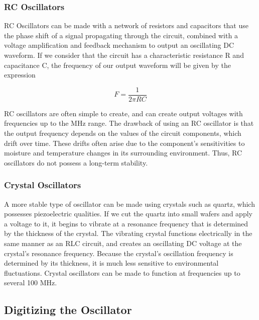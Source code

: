 \subsubsection{RC Oscillators}
\label{rc_oscillators} 

RC Oscillators can be made with a network of resistors and capacitors that use
the phase shift of a signal propagating through the circuit, combined with a voltage amplification and feedback mechanism to output an oscillating DC waveform.  If we consider that the circuit has a characteristic resistance R and capacitance C, the frequency of our output waveform will be given by the expression

\begin{equation}
  \label{eq:freq_rc}
  F = \frac{1}{2\pi R C}
\end{equation}

RC oscillators are often simple to create, and can create output voltages with
frequencies up to the MHz range.  The drawback of using an RC oscillator is
that the output frequency depends on the values of the circuit components,
which drift over time.  These drifts often arise due to the component's
sensitivities to moisture and temperature changes in its surrounding
environment.  Thus, RC oscillators do not possess a long-term stability.

\subsubsection{Crystal Oscillators}
\label{crystal_oscillators} 

A more stable type of oscillator can be made using crystals such as quartz,
which possesses piezoelectric qualities.  If we cut the quartz into small wafers and apply a voltage to it, it begins to vibrate at a resonance frequency that is determined by the thickness of the crystal.  The vibrating crystal functions electrically in the same manner as an RLC circuit, and creates an oscillating DC voltage at the crystal's resonance frequency.  
Because the crystal's oscillation frequency is determined by its thickness, it is much less sensitive to environmental fluctuations.  Crystal oscillators can be made to function at frequencies up to several 100 MHz.

\subsection{Digitizing the Oscillator} 

